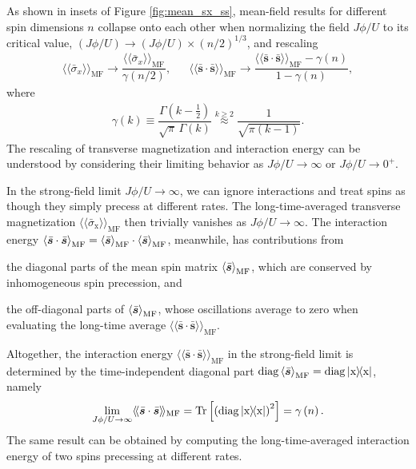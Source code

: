 \documentclass[nofootinbib,twocolumn]{revtex4-2}
\newcommand{\f}[2]{\dfrac{#1}{#2}} %
\newcommand{\p}[1]{\left(#1\right)} %
\renewcommand{\sp}[1]{\left[#1\right]} %
\newcommand{\bk}{\Braket} %
\renewcommand{\v}{\bm} %
\renewcommand{\c}{\cdot} %
\newcommand{\bbk}[1]{\langle\!\langle #1 \rangle\!\rangle}
\newcommand{\1}{\mathds{1}}
\newcommand{\x}{\text{x}}
\newcommand{\MF}{\text{MF}}
\renewcommand{\ss}{\bar{\v s}\c\bar{\v s}}
\DeclareMathOperator{\diag}{diag}
\begin{document}
As shown in insets of Figure \ref{fig:mean_sx_ss}, mean-field results for different spin dimensions $n$ collapse onto each other when normalizing the field $J\phi/U$ to its critical value, $\p{J\phi/U}\to\p{J\phi/U}\times\p{n/2}^{1/3}$, and rescaling
\begin{align}
  \bbk{\bar\sigma_x}_\MF \to \f{\bbk{\bar\sigma_x}_\MF}{\gamma\p{n/2}},
  &&
  \bbk{\ss}_\MF \to \f{\bbk{\ss}_\MF-\gamma\p{n}}{1-\gamma\p{n}},
  \label{eq:rescale}
\end{align}
where
\begin{align}
  \gamma\p{k} \equiv \f{\Gamma\p{k-\frac12}}{\sqrt\pi\,\Gamma\p{k}}
  \stackrel{k\ge2}{\approx} \f1{\sqrt{\pi(k-1)}}.
  \label{eq:gamma}
\end{align}
The rescaling of transverse magnetization and interaction energy can be understood by considering their limiting behavior as $J\phi/U\to\infty$ or $J\phi/U\to0^+$.

In the strong-field limit $J\phi/U\to\infty$, we can ignore interactions and treat spins as though they simply precess at different rates.
The long-time-averaged transverse magnetization $\bbk{\bar\sigma_\x}_\MF$ then trivially vanishes as $J\phi/U\to\infty$.
The interaction energy $\bk{\ss}_\MF = \bk{\bar{\v s}}_\MF \c \bk{\bar{\v s}}_\MF$, meanwhile, has contributions from
\begin{enumerate*}
\item the diagonal parts of the mean spin matrix $\bk{\bar{\v s}}_\MF$, which are conserved by inhomogeneous spin precession, and
\item the off-diagonal parts of $\bk{\bar{\v s}}_\MF$, whose oscillations average to zero when evaluating the long-time average $\bbk{\ss}_\MF$.
\end{enumerate*}
Altogether, the interaction energy $\bbk{\ss}_\MF$ in the strong-field limit is determined by the time-independent diagonal part $\diag\bk{\bar{\v s}}_\MF = \diag\op{\x}$, namely
\begin{align}
  \lim_{J\phi/U\to\infty} \bbk{\ss}_\MF
  = \Tr\sp{\p{\diag\op{\x}}^2}
  = \gamma\p{n}.
\end{align}
The same result can be obtained by computing the long-time-averaged interaction energy of two spins precessing at different rates.
\end{document}
